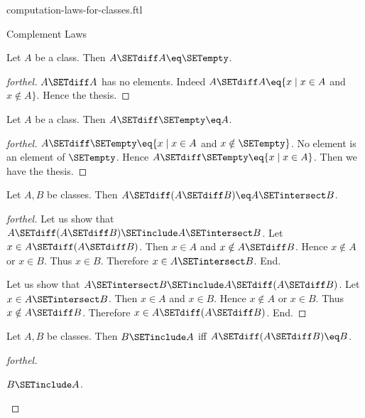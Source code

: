 \documentclass{naproche-library}
\begin{document}
\begin{smodule}[title=Computation Laws For Classes]{computation-laws-for-classes.ftl}
\begin{sfragment}{Complement Laws}
  \begin{proposition}[forthel,id=FOUNDATIONS_02_7433299337150464]
    Let $A$ be a class.
    Then $A \SETdiff A \eq \SETempty$.
  \end{proposition}
  \begin{proof}[forthel]
    $A \SETdiff A$ has no elements.
    Indeed $A \SETdiff A \eq \{ x \mid x \in A$ and $x \notin A \}$.
    Hence the thesis.
  \end{proof}

  \begin{proposition}[forthel,id=FOUNDATIONS_02_3783696985358336]
    Let $A$ be a class.
    Then $A \SETdiff \SETempty \eq A$.
  \end{proposition}
  \begin{proof}[forthel]
    $A \SETdiff \SETempty \eq \{ x \mid x \in A$ and $x \notin \SETempty \}$.
    No element is an element of $\SETempty$.
    Hence $A \SETdiff \SETempty \eq \{ x \mid x \in A \}$.
    Then we have the thesis.
  \end{proof}

  \begin{proposition}[forthel,id=FOUNDATIONS_02_7083929257377792]
    Let $A, B$ be classes.
    Then $A \SETdiff (A \SETdiff B) \eq A \SETintersect B$.
  \end{proposition}
  \begin{proof}[forthel]
    Let us show that $A \SETdiff (A \SETdiff B) \SETinclude A \SETintersect B$.
      Let $x \in A \SETdiff (A \SETdiff B)$.
      Then $x \in A$ and $x \notin A \SETdiff B$.
      Hence $x \notin A$ or $x \in B$.
      Thus $x \in B$.
      Therefore $x \in A \SETintersect B$.
    End.

    Let us show that $A \SETintersect B \SETinclude A \SETdiff (A \SETdiff B)$.
      Let $x \in A \SETintersect B$.
      Then $x \in A$ and $x \in B$.
      Hence $x \notin A$ or $x \in B$.
      Thus $x \notin A \SETdiff B$.
      Therefore $x \in A \SETdiff (A \SETdiff B)$.
    End.
  \end{proof}

  \begin{proposition}[forthel,id=FOUNDATIONS_02_4938646769631232]
    Let $A, B$ be classes.
    Then $B \SETinclude A$ iff $A \SETdiff (A \SETdiff B) \eq B$.
  \end{proposition}
  \begin{proof}[forthel]
    \begin{case}{$B \SETinclude A$.} \end{case}


\end{proof}
\end{sfragment}
\end{smodule}
\end{document}
